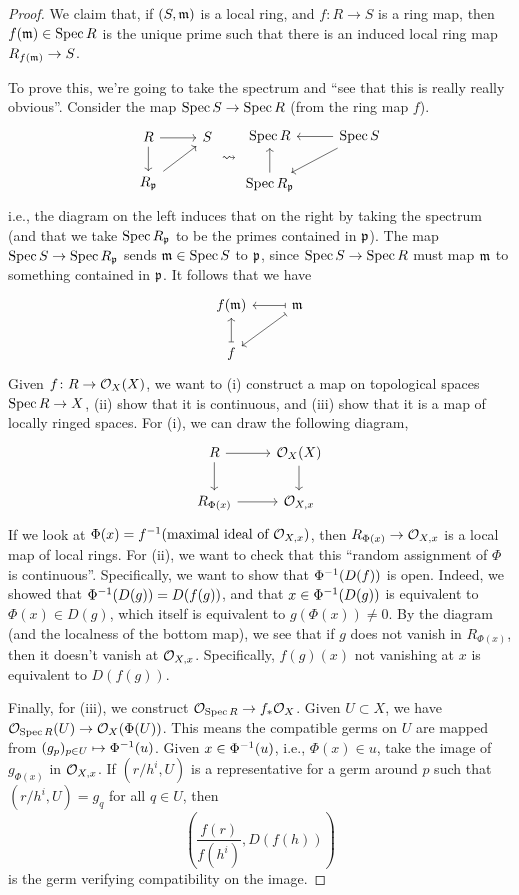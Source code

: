 \newpage
\begin{proof}
    We claim that, if $(S, \mathfrak m)$ is a local ring, and $f \colon R \to S$ is a ring map, then $f(\mathfrak m) \in \operatorname{Spec} R$ is the unique prime such that there is an induced local ring map $R_{f(\mathfrak m)} \to S$.

    To prove this, we're going to take the spectrum and ``see that this is really really obvious''. Consider the map $\operatorname{Spec} S \to \operatorname{Spec} R$ (from the ring map $f$).
    \[ \begin{tikzcd} R \arrow[r] \arrow[d] & S \\ R_\kp \arrow[ur] \end{tikzcd} \leadsto \begin{tikzcd} \Spec R & \Spec S \arrow[l] \arrow[dl] \\ \Spec R_\kp \arrow[u] \end{tikzcd}  \]
    i.e., the diagram on the left induces that on the right by taking the spectrum (and that we take $\operatorname{Spec} R_\mathfrak p$ to be the primes contained in $\mathfrak p$). The map $\operatorname{Spec} S \to \operatorname{Spec} R_\mathfrak p$ sends $\mathfrak m \in \operatorname{Spec} S$ to $\mathfrak p$, since $\operatorname{Spec} S \to \operatorname{Spec} R$ must map $\mathfrak m$ to something contained in $\mathfrak p$. It follows that we have
    \[ \begin{tikzcd} f(\km) & \km \arrow[l, maps to] \arrow[dl, maps to] \\ f \arrow[u, maps to] \end{tikzcd} \]
    Given $f \colon R \to \mathcal O_X(X)$, we want to (i) construct a map on topological spaces $\operatorname{Spec} R \to X$, (ii) show that it is continuous, and (iii) show that it is a map of locally ringed spaces. For (i), we can draw the following diagram,
    \[ \begin{tikzcd} R \arrow[r] \arrow[d] & \SO_X(X) \arrow[d] \\ R_{\Phi(x)} \arrow[r] & \SO_{X,x} \end{tikzcd} \]
    If we look at $\Phi(x) = f^{-1}(\text{maximal ideal of $\mathcal O_{X,x}$})$, then $R_{\Phi(x)} \to \mathcal O_{X,x}$ is a local map of local rings. For (ii), we want to check that this ``random assignment of $\Phi$ is continuous''. Specifically, we want to show that $\Phi^{-1}(D(f))$ is open. Indeed, we showed that $\Phi^{-1}(D(g)) = D(f(g))$, and that $x \in \Phi^{-1}(D(g))$ is equivalent to $\Phi(x) \in D(g)$, which itself is equivalent to $g(\Phi(x)) \neq 0$. By the diagram (and the localness of the bottom map), {\color{amethyst}we see that if $g$ does not vanish in $R_{\Phi(x)}$, then it doesn't vanish at $\mathcal O_{X, x}$}. Specifically, $f(g)(x)$ not vanishing at $x$ is equivalent to $D(f(g))$.

    Finally, for (iii), we construct $\mathcal O_{\operatorname{Spec} R} \to f_\ast \mathcal O_X$. Given $U \subset X$, we have $\mathcal O_{\operatorname{Spec} R}(U) \to \mathcal O_X(\Phi(U))$. This means the compatible germs on $U$ are mapped from $(g_p)_{p \in U} \mapsto \Phi^{-1}(u)$. Given $x \in \Phi^{-1}(u)$, i.e., $\Phi(x) \in u$, take the image of $g_{\Phi(x)}$ in $\mathcal O_{X,x}$. If $(r/h^i, U)$ is a representative for a germ around $p$ such that $(r/h^i, U) = g_q$ for all $q \in U$, then
    \[ \left(\frac{f(r)}{f(h^i)}, D(f(h))\right) \]
    is the germ verifying compatibility on the image.
\end{proof}

